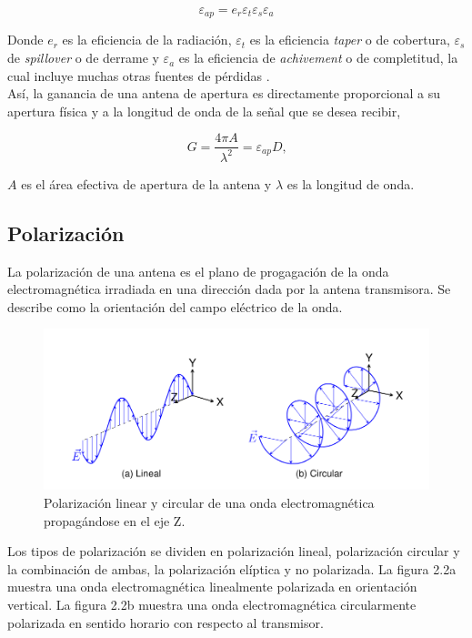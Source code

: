 \begin{equation}
    \varepsilon_{ap} = e_{r} \varepsilon_{t} \varepsilon_{s} \varepsilon_{a}
\end{equation}

Donde $e_{r}$ es la eficiencia de la radiación, $\varepsilon_{t}$ es la eficiencia \textit{taper} o de cobertura, $\varepsilon_{s}$ de \textit{spillover} o de derrame y $\varepsilon_{a}$ es la eficiencia de \textit{achivement} o de completitud, la cual incluye muchas otras fuentes de pérdidas \cite{stutzman2012antenna}.\\

Así, la ganancia de una antena de apertura es directamente proporcional a su apertura física y a la longitud de onda de la señal que se desea recibir,

\begin{equation}
    G = \frac{4\pi A}{\lambda^{2}} = \varepsilon_{ap} D \text{,}
\end{equation}

$A$ es el área efectiva de apertura de la antena y $\lambda$ es la longitud de onda.\\

\subsection{Polarización}

La polarización de una antena es el plano de progagación de la onda electromagnética irradiada en una dirección dada por la antena transmisora. Se describe como la orientación del campo eléctrico de la onda.\\

\begin{figure}
    \centering
    \includegraphics[width = 0.8\linewidth]{img/pol}
    \caption{Polarización linear y circular de una onda electromagnética propagándose en el eje Z.}
    \label{fig:polarizacion2}
\end{figure}

Los tipos de polarización se dividen en polarización lineal, polarización circular y la combinación de ambas, la polarización elíptica y no polarizada. La figura 2.2a muestra una onda electromagnética linealmente polarizada en orientación vertical. La figura 2.2b muestra una onda electromagnética circularmente polarizada en sentido horario con respecto al transmisor.\\




